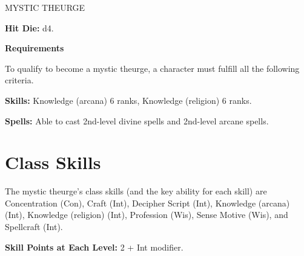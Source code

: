 \documentclass{article}
\begin{document}
\vspace{12pt}
MYSTIC THEURGE

\textbf{Hit Die:} d4.

\textbf{Requirements}

To qualify to become a mystic theurge, a character must fulfill all the following 
criteria.

\textbf{Skills:} Knowledge (arcana) 6 ranks, Knowledge (religion) 6 ranks.

\textbf{Spells:} Able to cast 2nd-level divine spells and 2nd-level arcane spells.

\section*{\textbf{Class Skills}}

The mystic theurge's class skills (and the key ability for each skill) are Concentration 
(Con), Craft (Int), Decipher Script (Int), Knowledge (arcana) (Int), Knowledge 
(religion) (Int), Profession (Wis), Sense Motive (Wis), and Spellcraft (Int).  

\parindent=3pt
\textbf{Skill Points at Each Level:} 2 + Int modifier.
\end{document}
